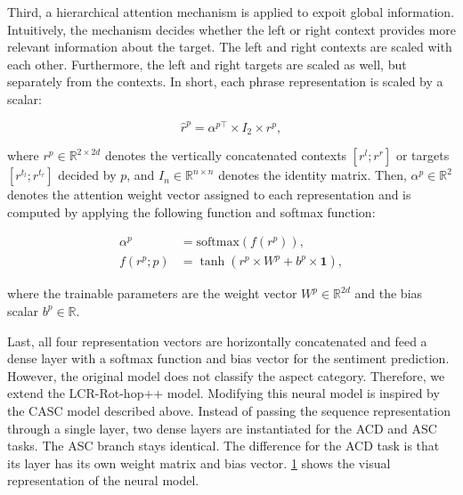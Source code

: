 \documentclass[american, oneside]{ecsgdp}
\begin{document}
Third, a hierarchical attention mechanism is applied to expoit global information. Intuitively, the mechanism decides whether the left or right context provides more relevant information about the target. The left and right contexts are scaled with each other. Furthermore, the left and right targets are scaled as well, but separately from the contexts. In short, each phrase representation is scaled by a scalar:

\begin{equation}
    \hat{r}^p = \alpha^{p\top} \times I_2 \times  r^p , \label{eq:hier_att}
\end{equation}

\noindent where $r^p \in \mathbb{R}^{2 \times 2d}$ denotes the vertically concatenated contexts $[r^l; r^r]$ or targets $[r^{t_l}; r^{t_r}]$ decided by $p$, and $I_n \in \mathbb{R}^{n \times n}$ denotes the identity matrix. Then, $\alpha^p \in \mathbb{R}^2$ denotes the attention weight vector assigned to each representation and is computed by applying the following function and softmax function:

\begin{align}
    \alpha^p                         & = \text{softmax}\left( f \left( r^p\right) \right), \label{eq:hier_alpha}\\
    f \left( r^p; p \right) & = \tanh{\left( r^{p} \times W^p + b^p \times \mathbf{1} \right)}, \label{eq:hier_tanh}
\end{align}

\noindent where the trainable parameters are the weight vector $W^p \in \mathbb{R}^{2d}$ and the bias scalar $b^p \in \mathbb{R}$. 

Last, all four representation vectors are horizontally concatenated and feed a dense layer with a softmax function and bias vector for the sentiment prediction. However, the original model does not classify the aspect category. Therefore, we extend the LCR-Rot-hop++ model. Modifying this neural model is inspired by the CASC model described above. Instead of passing the sequence representation through a single layer, two dense layers are instantiated for the ACD and ASC tasks. The ASC branch stays identical. The difference for the ACD task is that its layer has its own weight matrix and bias vector. \cref{fig:CASC+LCR} shows the visual representation of the neural model.

\begin{figure}[htbp]
  \centering
  
  \caption{}
  \label{fig:CASC+LCR}
\end{figure}
\end{document}
